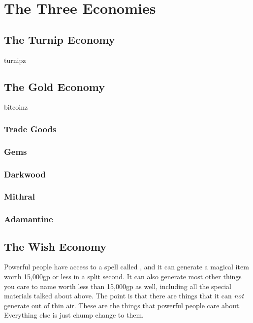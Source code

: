 \section{The Three Economies}

\subsection{The Turnip Economy}

turnipz

\subsection{The Gold Economy}

bitcoinz

\subsubsection{Trade Goods}

\subsubsection{Gems}

\subsubsection{Darkwood}

\subsubsection{Mithral}

\subsubsection{Adamantine}

\subsection{The Wish Economy}

Powerful people have access to a spell called , and it can generate a magical item worth 15,000gp or less in a split second. It can also generate most other things you care to name worth less than 15,000gp as well, including all the special materials talked about above. The point is that there are things that it can \textit{not} generate out of thin air. These are the things that powerful people care about. Everything else is just chump change to them.

